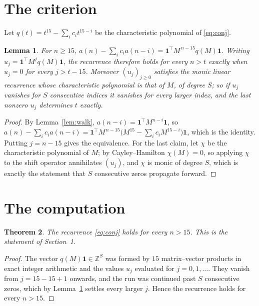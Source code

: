 \documentclass[11pt,a4paper]{article}
\theoremstyle{plain}
\newtheorem{theorem}{Theorem}
\newtheorem{lemma}[theorem]{Lemma}
\theoremstyle{definition}
\begin{document}
\section{The criterion}

Let $q(t)=t^{15}-\sum_i c_i t^{15-i}$ be the characteristic polynomial of
\eqref{eq:conj}.

\begin{lemma}\label{lem:crit}
For $n\ge15$,
$a(n)-\sum_i c_i a(n-i)=\mathbf{1}^{\!\top}M^{\,n-15}q(M)\mathbf{1}$. Writing
$u_j=\mathbf{1}^{\!\top}M^{j}q(M)\mathbf{1}$, the recurrence therefore holds for every
$n>t$ exactly when $u_j=0$ for every $j>t-15$. Moreover $(u_j)_{j\ge0}$ satisfies the
monic linear recurrence whose characteristic polynomial is that of $M$, of degree $S$; so
if $u_j$ vanishes for $S$ consecutive indices it vanishes for every larger index, and the
last nonzero $u_j$ determines $t$ exactly.
\end{lemma}

\begin{proof}
By Lemma~\ref{lem:walk}, $a(n-i)=\mathbf{1}^{\!\top}M^{n-i}\mathbf{1}$, so
$a(n)-\sum_i c_i a(n-i)
=\mathbf{1}^{\!\top}M^{\,n-15}\bigl(M^{15}-\sum_i c_i M^{15-i}\bigr)
\mathbf{1}$, which is the identity. Putting $j=n-15$ gives the equivalence. For the
last claim, let $\chi$ be the characteristic polynomial of $M$; by Cayley--Hamilton
$\chi(M)=0$, so applying $\chi$ to the shift operator annihilates $(u_j)$, and $\chi$ is
monic of degree $S$, which is exactly the statement that $S$ consecutive zeros propagate
forward.
\end{proof}

\section{The computation}

\begin{theorem}
The recurrence \eqref{eq:conj} holds for every $n>15$. This is the statement of
Section~1.
\end{theorem}

\begin{proof}
The vector $q(M)\mathbf{1}\in\mathbb{Z}^{S}$ was formed by $15$ matrix--vector
products in exact integer arithmetic and the values $u_j$ evaluated for
$j=0,1,\dots$. They vanish from $j=15-15+1$ onwards, and the run was continued past
$S$ consecutive zeros, which by Lemma~\ref{lem:crit} settles every larger $j$. Hence the
recurrence holds for every $n>15$.
\end{proof}
\end{document}
